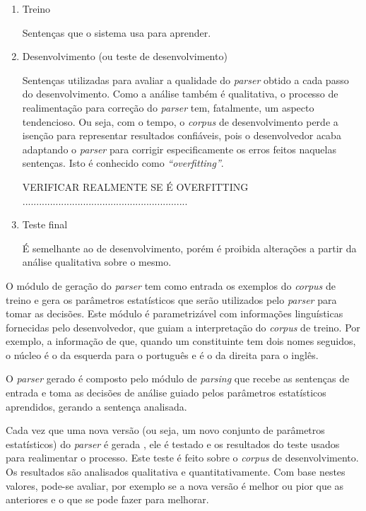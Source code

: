 \begin{enumerate}


\item{Treino} %
\label{sub:treino}

Sentenças que o sistema usa para aprender.

\item{Desenvolvimento (ou teste de desenvolvimento)} %
\label{sub:desenvolvimento_ou_teste_de_desenvolvimento_}

Sentenças utilizadas para avaliar a qualidade do \emph{parser} obtido a cada passo do desenvolvimento. Como a análise também é qualitativa, o processo de realimentação para correção do \emph{parser} tem, fatalmente, um aspecto tendencioso. Ou seja, com o tempo, o \emph{corpus} de desenvolvimento perde a isenção para representar resultados confiáveis, pois o desenvolvedor acaba adaptando o \emph{parser} para corrigir especificamente os erros feitos naquelas sentenças. Isto é conhecido como \emph{``overfitting''}.


VERIFICAR REALMENTE SE É OVERFITTING ............................................................




\item{Teste final} %
\label{sub:teste_final}

É semelhante ao de desenvolvimento, porém é proibida alterações a partir da análise qualitativa sobre o mesmo.

\end{enumerate}

O módulo de geração do \emph{parser} tem como entrada os exemplos do \emph{corpus} de treino e gera os parâmetros estatísticos que serão utilizados pelo \emph{parser} para tomar as decisões. Este módulo é parametrizável com informações linguísticas fornecidas pelo desenvolvedor, que guiam a interpretação do \emph{corpus} de treino. Por exemplo, a informação de que, quando um constituinte tem dois nomes seguidos, o núcleo é o da esquerda para o português e é o da direita para o inglês.

O \emph{parser} gerado é composto pelo módulo de \emph{parsing} que recebe as sentenças de entrada e toma as decisões de análise guiado pelos parâmetros estatísticos aprendidos, gerando a sentença analisada.

Cada vez que uma nova versão (ou seja, um novo conjunto de parâmetros estatísticos) do \emph{parser} é gerada , ele é testado e os resultados do teste usados para realimentar o processo. Este teste é feito sobre o \emph{corpus} de desenvolvimento. Os resultados são analisados qualitativa e quantitativamente. Com base nestes valores, pode-se avaliar, por exemplo se a nova versão é melhor ou pior que as anteriores e o que se pode fazer para melhorar.


